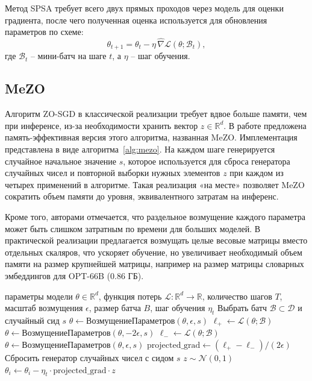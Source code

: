 \documentclass[LI,KR]{HSEUniversity}
\begin{document}
Метод SPSA требует всего двух прямых проходов через модель для оценки градиента, после чего полученная оценка используется для обновления параметров по схеме:
$$
\theta_{t+1} = \theta_t - \eta\, \widehat{\nabla} \mathcal{L}(\theta; \mathcal{B}_t),
$$
где $\mathcal{B}_t$ – мини-батч на шаге $t$, а $\eta$ – шаг обучения.

\subsection{MeZO}

Алгоритм ZO-SGD в классической реализации требует вдвое больше памяти, чем при инференсе, из-за необходимости хранить вектор $z \in \mathbb{R}^d$.
В работе \cite{mezo} предложена память-эффективная версия этого алгоритма, названная MeZO.
Имплементация представлена в виде алгоритма~\ref{alg:mezo}.
На каждом шаге генерируется случайное начальное значение $s$, которое используется для сброса генератора случайных чисел и повторной выборки нужных элементов $z$ при каждом из четырех применений в алгоритме.
Такая реализация «на месте» позволяет MeZO сократить объем памяти до уровня, эквивалентного затратам на инференс.

Кроме того, авторами отмечается, что раздельное возмущение каждого параметра может быть слишком затратным по времени для больших моделей.
В практической реализации предлагается возмущать целые весовые матрицы вместо отдельных скаляров, что ускоряет обучение,
но увеличивает необходимый объем памяти на размер крупнейшей матрицы, например на размер матрицы словарных эмбеддингов для OPT-66B (0.86 ГБ).

\begin{algorithm}[H]
\caption{MeZO}
\begin{algorithmic}[1]
\Require параметры модели $\theta \in \mathbb{R}^d$, функция потерь $\mathcal{L} : \mathbb{R}^d \rightarrow \mathbb{R}$, количество шагов $T$, масштаб возмущения $\epsilon$, размер батча $B$, шаг обучения $\eta_t$
    \State Выбрать батч $\mathcal{B} \subset \mathcal{D}$ и случайный сид $s$
    \State $\theta \leftarrow \text{ВозмущениеПараметров}(\theta, \epsilon, s)$
    \State $\ell_+ \leftarrow \mathcal{L}(\theta; \mathcal{B})$
    \State $\theta \leftarrow \text{ВозмущениеПараметров}(\theta, -2\epsilon, s)$
    \State $\ell_- \leftarrow \mathcal{L}(\theta; \mathcal{B})$
    \State $\theta \leftarrow \text{ВозмущениеПараметров}(\theta, \epsilon, s)$ 
    \State $\text{projected\_grad} \leftarrow (\ell_+ - \ell_-)/(2\epsilon)$
    \State Сбросить генератор случайных чисел с сидом $s$ 
        \State $z \sim \mathcal{N}(0, 1)$
        \State $\theta_i \leftarrow \theta_i - \eta_t \cdot \text{projected\_grad} \cdot z$
    \EndFor
\EndFor
\end{algorithmic}
\label{alg:mezo}
\end{algorithm}
\end{document}
